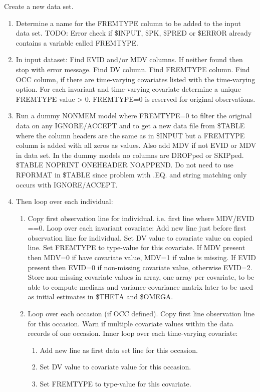 Create a new data set.
\begin{enumerate} 
	\item Determine a name for the FREMTYPE column to be added to the input data set. 
TODO: Error check if \$INPUT, \$PK, \$PRED or \$ERROR already contains a variable called FREMTYPE.
	\item In input dataset: Find EVID and/or MDV columns. If neither found then stop with error message. Find DV column. Find FREMTYPE column. Find OCC column, if there are time-varying covariates listed with the time-varying option. For each invariant and time-varying covariate  determine a unique FREMTYPE value > 0. FREMTYPE=0 is reserved for original observations.
	\item Run a dummy NONMEM model where FREMTYPE=0 to filter the original data on any IGNORE/ACCEPT and to get a new data file from \$TABLE where the column headers are the same as in \$INPUT but a FREMTYPE column is added with all zeros as values. Also add MDV if not EVID or MDV in data set. In the dummy models no columns are DROPped or SKIPped. \$TABLE NOPRINT ONEHEADER NOAPPEND.  Do not need to use RFORMAT in \$TABLE since problem with .EQ. and string matching only occurs with IGNORE/ACCEPT.
\item Then loop over each individual: 
\begin{enumerate}
	\item Copy first observation line for individual. i.e. first line where MDV/EVID ==0. 
Loop over each invariant covariate: Add new line just before first observation line for individual. 
Set DV value to covariate value on copied line. 
Set FREMTYPE to type-value for this covariate. 
If MDV present then MDV=0 if have covariate value, MDV=1 if value is missing. 
If EVID present then EVID=0 if non-missing covariate value, otherwise EVID=2. 
Store non-missing covariate values in array, one array per covariate, to be able to compute medians and 
variance-covariance matrix later to be used as initial estimates in \$THETA and \$OMEGA. 
	\item Loop over each occasion (if OCC defined). 
Copy first line observation line for this occasion. 
Warn if multiple  covariate values within the data records of one occasion. 
Inner loop over each time-varying covariate: 
\begin{enumerate}
	\item Add new line as first data set line for this occasion. 
    \item Set DV value to covariate value for this occasion. 
    \item Set FREMTYPE to type-value for this covariate. 

\end{enumerate}
\end{enumerate}
\end{enumerate}
